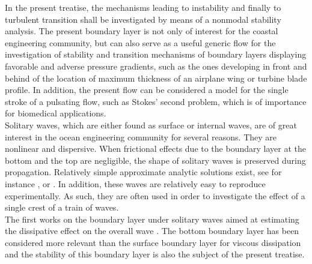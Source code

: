 \documentclass{jfm}
\begin{document}
In the present
treatise, the mechanisms leading to instability
and finally to turbulent transition shall be investigated
by means of a nonmodal stability analysis.
The present boundary layer is not only of interest
for the coastal engineering community, but can also
serve as a useful generic flow for the investigation of
stability and
transition mechanisms of boundary layers displaying
favorable and adverse pressure gradients, such as
the ones developing in front and behind of the
location of maximum thickness of an airplane wing
or turbine blade profile. In addition,
the present flow can be considered a model
for the single stroke of a pulsating flow, such as Stokes'
second problem,
which is of importance for biomedical applications.\\ %

Solitary waves, which are either found
as surface or internal waves, are of great interest in the ocean engineering
community for several reasons.
They are nonlinear and dispersive. When frictional effects due
to the boundary layer at the bottom and the top 
are negligible, the shape of solitary waves is preserved during
propagation. Relatively simple approximate analytic solutions exist,
see for instance \citet{Benjamin1966}, \citet{Grimshaw1971}
or \citet{Fenton1972}. In addition,
these waves are relatively easy to reproduce experimentally. 
As such, they are often used in order to investigate the 
effect of a single crest of a train of waves. \\

The first works on the boundary layer under solitary waves
aimed at estimating the dissipative effect on the overall
wave \citep{Shuto1976,Miles1980}. 
The bottom boundary layer has been considered
more relevant than the surface boundary layer for viscous dissipation
\citep{LiuOrfila2004} and
the stability of this boundary layer is also the subject of the
present treatise. \\
\begin{comment}
More detailed experimental and numerical work on 
this boundary layer and its stability properties has
been performed first for the boundary layer under
internal solitary waves, since this boundary layer is important 
for transport of sediments on the bottom of the sea
\citep{BoguckiDickeyRedekopp1997}. 
By means of direct
numerical simulation
\citet{DiamessisRedekopp2005} obtained a relationship for the critical parameters for which transition occurs. However,
experimental results \citep{CarrDavies2006,CarrDavies2010} 
contradict this relationship,
as cases deemed stable displayed
instabilities and cases deemed unstable did not. More recently,
a modified formula for the critical parameters has been advanced in \cite{AghsaeeBoegmanDiamessisLamb2012}
by means of direct numerical simulation.\\
\end{comment}
\end{document}
